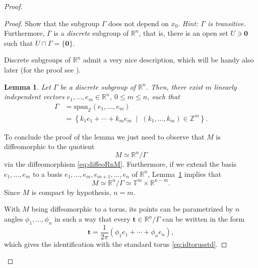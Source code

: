 \documentclass[english,fontsize=11pt,paper=a5,oneside]{scrbook}
\newcommand{\Z}{\mathbb{Z}}
\newcommand{\R}{\mathbb{R}}
\newcommand{\T}{\mathbb{T}}
\newtheorem{lemma}[theorem]{Lemma}
\theoremstyle{definition}
\newenvironment{exercise}
  {\pushQED{\qed}\renewcommand{\qedsymbol}{$\maltese$}\exercisex}
  {\popQED\endexercisex}
\begin{document}
\begin{proof}
\begin{proof}
        \begin{exercise}
            Show that the subgroup $\Gamma$ does not depend on $x_0$. \textit{Hint: $\Gamma$ is transitive.} 
            Furthermore, $\Gamma$ is a \emph{discrete} subgroup of $\R^n$, that is, there is an open set $U \ni \bm 0$ such that $U\cap\Gamma = \{\bm 0\}$.
        \end{exercise}

        Discrete subgroups of $\R^n$ admit a very nice description, which will be handy also later (for the proof see \cite[Lemma 13.4]{book:knauf}).

        \begin{lemma}
            \label{lem:reprTm}
            Let $\Gamma$ be a discrete subgroup of $\R^n$. Then, there exist $m$ linearly independent vectors $e_1, \ldots, e_m \in \R^n$, $0\leq m \leq n$, such that
            \begin{align}
                \Gamma &= \mathrm{span}_{\Z}(e_1, \ldots, e_m)\\
                & = \left\{
                    k_1 e_1 + \cdots + k_m e_m \;\mid\; (k_1, \ldots, k_m)\in\Z^m
                    \right\}.
            \end{align}
        \end{lemma}

        To conclude the proof of the lemma we just need to observe that $M$ is diffeomorphic to the quotient
        \begin{equation}
            M \simeq \R^n / \Gamma
        \end{equation}
        via the diffeomorphism \eqref{eq:diffeoRnM}. Furthermore, if we extend the basis $e_1, \ldots, e_m$ to a basis $e_1, \ldots, e_m, e_{m+1}, \ldots,e_n$ of $\R^n$, Lemma~\ref{lem:reprTm} implies that
        \begin{equation}
            M \simeq \R^n / \Gamma \simeq \T^m \times \R^{n-m}.
        \end{equation}
        Since $M$ is compact by hypothesis, $n=m$.

        With $M$ being diffeomorphic to a torus, its points can be parametrized by $n$ angles $\phi_1, \ldots, \phi_n$ in such a way that every $\bm t \in \R^n/\Gamma$ can be written in the form
        \begin{equation}
            \bm t = \frac 1{2\pi}(\phi_1 e_1 + \cdots + \phi_n e_n),
        \end{equation}
        which gives the identification with the standard torus \eqref{eq:idtorusstd}.
    \end{proof}


\end{proof}
\end{document}
